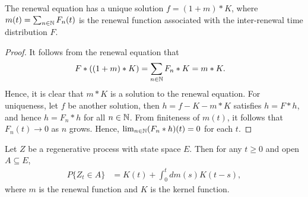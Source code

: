 \documentclass[a4paper,10pt,english]{article}
\begin{document}
\begin{thm} 
The renewal equation has a unique solution $f = (1 + m) \ast K$, where $m(t) = \sum_{n \in \mathbb{N}}F_n(t)$ is the renewal function associated with the inter-renewal time distribution $F$. 
\end{thm}
\begin{proof}
It follows from the renewal equation that 
\begin{align*}
F\ast((1+m)\ast K) &= \sum_{n \in \mathbb{N}}F_n \ast K = m \ast K.
\end{align*}
Hence, it is clear that $m \ast K$ is a solution to the renewal equation. 
For uniqueness, let $f$ be another solution, then $h = f - K - m \ast K$ satisfies $h = F \ast h$, and hence $h = F_n \ast h$ for all $n \in \mathbb{N}$. 
From finiteness of $m(t)$, it follows that $F_n(t) \to 0$ as $n$ grows. 
Hence, $\lim_{n\in\mathbb{N}}(F_n\ast h)(t) = 0$ for each $t$. 
\end{proof}

\begin{prop} 
Let $Z$ be a regenerative process with state space $E$. 
Then for any $t \geq 0$ and open $A \subseteq E$, 
\begin{align*}
P\{Z_t \in A\} &= K(t) + \int_{0}^tdm(s)K(t-s),
\end{align*}
where $m$ is the renewal function and $K$ is the kernel function. 
\end{prop}
\end{document}
